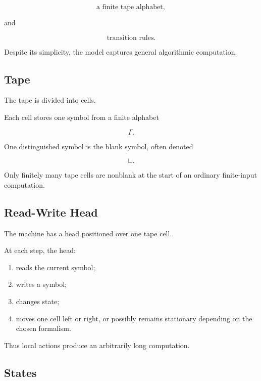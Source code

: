 \[
\boxed{
\text{a finite tape alphabet},
}
\]

and

\[
\boxed{
\text{transition rules}.
}
\]

Despite its simplicity, the model captures general algorithmic computation.

\subsection{Tape}
\label{subsec:turing-machine-tape}

The tape is divided into cells.

Each cell stores one symbol from a finite alphabet

\[
\Gamma.
\]

One distinguished symbol is the blank symbol, often denoted

\[
\boxed{
\sqcup.
}
\]

Only finitely many tape cells are nonblank at the start of an ordinary
finite-input computation.

\subsection{Read-Write Head}
\label{subsec:turing-machine-head}

The machine has a head positioned over one tape cell.

At each step, the head:

\begin{enumerate}
    \item reads the current symbol;
    \item writes a symbol;
    \item changes state;
    \item moves one cell left or right, or possibly remains stationary
          depending on the chosen formalism.
\end{enumerate}

Thus local actions produce an arbitrarily long computation.

\subsection{States}
\label{subsec:turing-machine-states}


